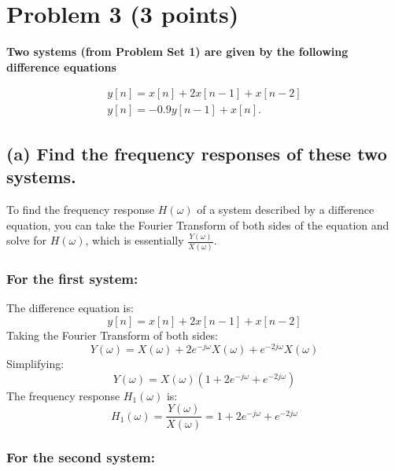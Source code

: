 \section{Problem 3 (3 points)}
\textbf{Two systems (from Problem Set 1) are given by the following difference
equations}

\begin{equation*}
    \begin{array}{l}y[n]=x[n]+2 x[n-1]+x[n-2] \\ y[n]=-0.9 y[n-1]+x[n] .\end{array} 
\end{equation*}

\subsection*{(a) Find the frequency responses of these two systems.}

To find the frequency response \( H(\omega) \) of a system described by a difference equation, you can take the Fourier Transform of both sides of the equation and solve for \( H(\omega) \), which is essentially \( \frac{Y(\omega)}{X(\omega)} \).

\subsubsection*{For the first system:}

The difference equation is:
\begin{equation*}
y[n] = x[n] + 2x[n-1] + x[n-2]
\end{equation*}
Taking the Fourier Transform of both sides:
\begin{equation*}
Y(\omega) = X(\omega) + 2e^{-j\omega}X(\omega) + e^{-2j\omega}X(\omega)
\end{equation*}
Simplifying:
\begin{equation*}
Y(\omega) = X(\omega)(1 + 2e^{-j\omega} + e^{-2j\omega})
\end{equation*}
The frequency response \( H_1(\omega) \) is:
\begin{equation*}
H_1(\omega) = \frac{Y(\omega)}{X(\omega)} = 1 + 2e^{-j\omega} + e^{-2j\omega}
\end{equation*}

\subsubsection*{For the second system:}

